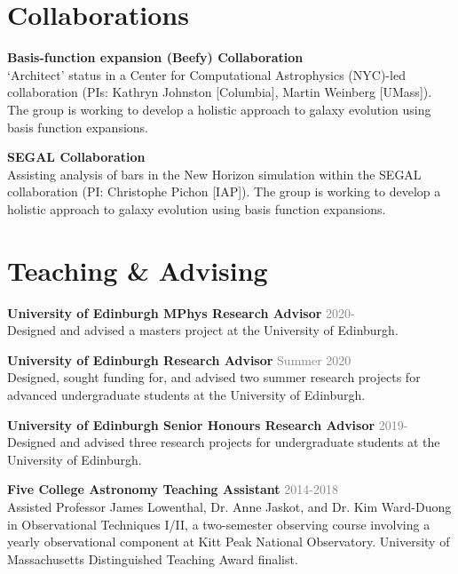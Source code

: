 \documentclass[margin, a4paper,11pt]{res} %
\begin{document}
\begin{resume}
\section{\sc \textcolor{redshade}{Collaborations}}

{\bf Basis-function expansion (Beefy) Collaboration} \\
`Architect' status in a Center for Computational Astrophysics (NYC)-led collaboration (PIs: Kathryn Johnston [Columbia], Martin Weinberg [UMass]). The group is working to develop a holistic approach to galaxy evolution using basis function expansions.

{\bf SEGAL Collaboration} \\
Assisting analysis of bars in the New Horizon simulation within the SEGAL collaboration (PI: Christophe Pichon [IAP]). The group is working to develop a holistic approach to galaxy evolution using basis function expansions.



\section{\sc \textcolor{redshade}{Teaching \& Advising}}

{\bf University of Edinburgh MPhys Research Advisor} \hfill\textcolor{grey}{2020-}\\
Designed and advised a masters project at the University of Edinburgh.

{\bf University of Edinburgh Research Advisor} \hfill\textcolor{grey}{Summer 2020}\\
Designed, sought funding for, and advised two summer research projects for advanced undergraduate students at the University of Edinburgh.

{\bf University of Edinburgh Senior Honours Research Advisor} \hfill\textcolor{grey}{2019-}\\
Designed and advised three research projects for undergraduate students at the University of Edinburgh.

{\bf Five College Astronomy Teaching Assistant} \hfill \textcolor{grey}{2014-2018}\\
Assisted Professor James Lowenthal, Dr. Anne Jaskot, and Dr. Kim Ward-Duong in Observational Techniques I/II, a two-semester observing course involving a yearly observational component at Kitt Peak National Observatory. University of Massachusetts Distinguished Teaching Award finalist.


\end{resume}
\end{document}
